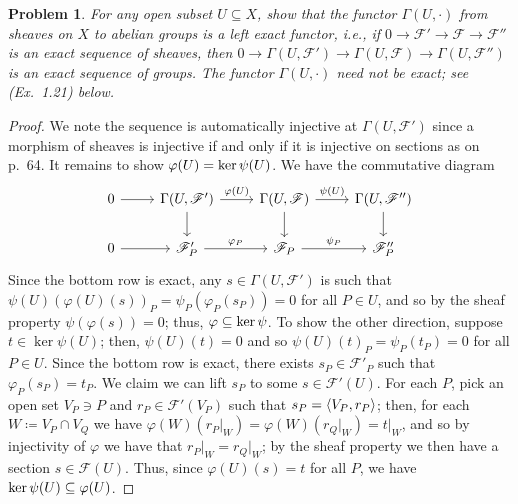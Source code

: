 \documentclass[12pt,letterpaper]{article}
\newtheorem{problem}{Problem}[section]
\theoremstyle{definition}
\theoremstyle{remark}
\numberwithin{equation}{section}
\numberwithin{figure}{problem}
\let\Im\relax
\DeclareMathOperator{\Im}{im}
\newcommand{\FF}{\mathscr{F}}
\begin{document}
\begin{problem}
  For any open subset $U \subseteq X$, show that the functor $\Gamma(U,\cdot)$ from sheaves on $X$ to abelian groups is a left exact functor, i.e., if $0 \to \mathscr{F}' \to \mathscr{F} \to \mathscr{F}''$ is an exact sequence of sheaves, then $0 \to \Gamma(U,\mathscr{F}') \to \Gamma(U,\mathscr{F}) \to \Gamma(U,\mathscr{F}'')$ is an exact sequence of groups. The functor $\Gamma(U,\cdot)$ need not be exact; see (Ex.~1.21) below.
\end{problem}
\begin{proof}
  We note the sequence is automatically injective at $\Gamma(U,\FF')$ since a morphism of sheaves is injective if and only if it is injective on sections as on p.~64. It remains to show $\Im\varphi(U) = \ker\psi(U)$. We have the commutative diagram
  \begin{equation*}
    \begin{tikzcd}
      0 \rar & \Gamma(U,\mathscr{F}') \rar{\varphi(U)}\dar & \Gamma(U,\mathscr{F}) \rar{\psi(U)}\dar & \Gamma(U,\mathscr{F}'')\dar\\
      0 \rar & \mathscr{F}'_P \rar{\varphi_P} & \mathscr{F}_P \rar{\psi_P} & \mathscr{F}''_P
    \end{tikzcd}
  \end{equation*}
  Since the bottom row is exact, any $s \in \Gamma(U,\mathscr{F}')$ is such that $\psi(U)(\varphi(U)(s))_P = \psi_P(\varphi_P(s_P)) = 0$ for all $P \in U$, and so by the sheaf property $\psi(\varphi(s)) = 0$; thus, $\Im\varphi \subseteq \ker\psi$. To show the other direction, suppose $t \in \ker\psi(U)$; then, $\psi(U)(t) = 0$ and so $\psi(U)(t)_P = \psi_P(t_P) = 0$ for all $P \in U$. Since the bottom row is exact, there exists $s_P \in \mathscr{F}'_P$ such that $\varphi_P(s_P) = t_P$. We claim we can lift $s_P$ to some $s \in \mathscr{F}'(U)$. For each $P$, pick an open set $V_P \ni P$ and $r_P \in \mathscr{F}'(V_P)$ such that $s_P = \braket{V_P,r_P}$; then, for each $W \coloneqq V_P \cap V_Q$ we have $\varphi(W)(r_P\vert_W) = \varphi(W)(r_Q\vert_W) = t\vert_W$, and so by injectivity of $\varphi$ we have that $r_P\vert_W = r_Q\vert_W$; by the sheaf property we then have a section $s \in \mathscr{F}(U)$. Thus, since $\varphi(U)(s) = t$ for all $P$, we have $\ker\psi(U) \subseteq \Im\varphi(U)$.
\end{proof}
\end{document}
